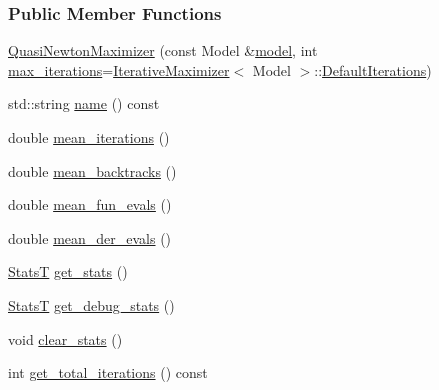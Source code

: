 \subsubsection*{Public Member Functions}
\begin{DoxyCompactItemize}
\item 
\hyperlink{classmappel_1_1estimator_1_1QuasiNewtonMaximizer_aaf9ace4fb22ebf4972f5eb37a2acb231}{Quasi\+Newton\+Maximizer} (const Model \&\hyperlink{classmappel_1_1estimator_1_1Estimator_a2f157410771fb79a20d4d54e505750d0}{model}, int \hyperlink{classmappel_1_1estimator_1_1IterativeMaximizer_abf5fe0b08cfbcc403c3d01511726aa38}{max\+\_\+iterations}=\hyperlink{classmappel_1_1estimator_1_1IterativeMaximizer}{Iterative\+Maximizer}$<$ Model $>$\+::\hyperlink{classmappel_1_1estimator_1_1IterativeMaximizer_ab66c01c2eee630f3fca119f3fe09a19a}{Default\+Iterations})
\item 
std\+::string \hyperlink{classmappel_1_1estimator_1_1QuasiNewtonMaximizer_ab70e4e435f00175c8afff18d97db0e18}{name} () const 
\item 
double \hyperlink{classmappel_1_1estimator_1_1IterativeMaximizer_a70504eeacb590296d249a51970736d3a}{mean\+\_\+iterations} ()
\item 
double \hyperlink{classmappel_1_1estimator_1_1IterativeMaximizer_a26cc129f7253798b7484a25ac59dfa71}{mean\+\_\+backtracks} ()
\item 
double \hyperlink{classmappel_1_1estimator_1_1IterativeMaximizer_ad6a2fc4797c19c411fde894669f1edba}{mean\+\_\+fun\+\_\+evals} ()
\item 
double \hyperlink{classmappel_1_1estimator_1_1IterativeMaximizer_a0fbb35e6f015bf1e1c5b1ee89f08cbad}{mean\+\_\+der\+\_\+evals} ()
\item 
\hyperlink{namespacemappel_a04ab395b0cf82c4ce68a36b2212649a5}{StatsT} \hyperlink{classmappel_1_1estimator_1_1IterativeMaximizer_a8a274f11cad09057aa2b0bc69f291c22}{get\+\_\+stats} ()
\item 
\hyperlink{namespacemappel_a04ab395b0cf82c4ce68a36b2212649a5}{StatsT} \hyperlink{classmappel_1_1estimator_1_1IterativeMaximizer_aa8f8cb9c66b559badee924617ec690b6}{get\+\_\+debug\+\_\+stats} ()
\item 
void \hyperlink{classmappel_1_1estimator_1_1IterativeMaximizer_a9c41aae7db286746e72e3d0ff8af1d13}{clear\+\_\+stats} ()
\item 
int \hyperlink{classmappel_1_1estimator_1_1IterativeMaximizer_a8c639ea1bf84e4531364906c933584af}{get\+\_\+total\+\_\+iterations} () const 
\item 

\end{DoxyCompactItemize}
